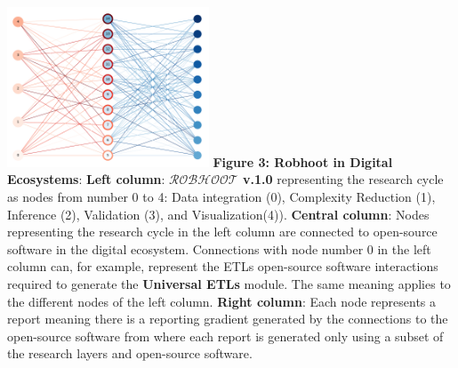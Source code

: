 \documentclass[10pt, a4paper, twocolumn]{article} %
\begin{document}
{  %
  \includegraphics[width=0.45\textwidth]{FigureRobhoot.pdf}
  {\small {\bf Figure 3: Robhoot in Digital Ecosystems}: {\bf Left
      column}: {\bf $\mathcal{ROBHOOT}$ v.1.0} representing the
    research cycle as nodes from number 0 to 4: Data integration (0),
    Complexity Reduction (1), Inference (2), Validation (3), and
    Visualization(4)). {\bf Central column}: Nodes representing the
    research cycle in the left column are connected to open-source
    software in the digital ecosystem. Connections with node number 0
    in the left column can, for example, represent the ETLs
    open-source software interactions required to generate the {\bf
      Universal ETLs} module. The same meaning applies to the
    different nodes of the left column. {\bf Right column}: Each node
    represents a report meaning there is a reporting gradient
    generated by the connections to the open-source software from
    where each report is generated only using a subset of the research
    layers and open-source software.}




}
\end{document}
